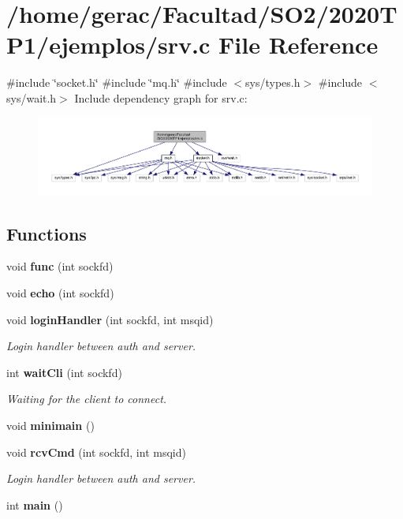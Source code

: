 \section{/home/gerac/\+Facultad/\+S\+O2/2020\+T\+P1/ejemplos/srv.c File Reference}
\label{srv_8c}
{\ttfamily \#include \char`\"{}socket.\+h\char`\"{}}\newline
{\ttfamily \#include \char`\"{}mq.\+h\char`\"{}}\newline
{\ttfamily \#include $<$sys/types.\+h$>$}\newline
{\ttfamily \#include $<$sys/wait.\+h$>$}\newline
Include dependency graph for srv.\+c\+:\nopagebreak
\begin{figure}[H]
\begin{center}
\leavevmode
\includegraphics[width=350pt]{srv_8c__incl}
\end{center}
\end{figure}
\subsection*{Functions}
\begin{DoxyCompactItemize}
\item 
void \textbf{ func} (int sockfd)
\item 
void \textbf{ echo} (int sockfd)
\item 
void \textbf{ login\+Handler} (int sockfd, int msqid)
\begin{DoxyCompactList}\small\item\em Login handler between auth and server. \end{DoxyCompactList}\item 
int \textbf{ wait\+Cli} (int sockfd)
\begin{DoxyCompactList}\small\item\em Waiting for the client to connect. \end{DoxyCompactList}\item 
void \textbf{ minimain} ()
\item 
void \textbf{ rcv\+Cmd} (int sockfd, int msqid)
\begin{DoxyCompactList}\small\item\em Login handler between auth and server. \end{DoxyCompactList}\item 
int \textbf{ main} ()
\end{DoxyCompactItemize}
